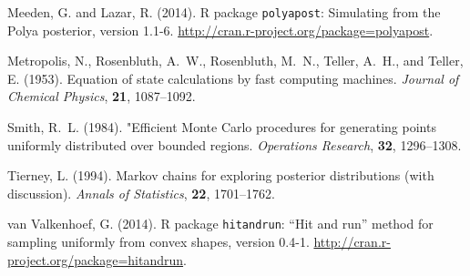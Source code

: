 \documentclass[11pt]{article}
\begin{document}
\begin{thebibliography}{}
Meeden, G. and Lazar, R. (2014).
\newblock R package \texttt{polyapost}: Simulating from the Polya posterior,
    version 1.1-6.
\newblock \url{http://cran.r-project.org/package=polyapost}.

Metropolis, N., Rosenbluth, A.~W., Rosenbluth, M.~N., Teller, A.~H., and
    Teller, E. (1953).
\newblock Equation of state calculations by fast computing machines.
\newblock \emph{Journal of Chemical Physics}, \textbf{21}, 1087--1092.

Smith, R.~L. (1984).
\newblock "Efficient Monte Carlo procedures for generating points
    uniformly distributed over bounded regions.
\newblock \emph{Operations Research}, \textbf{32}, 1296--1308.

Tierney, L. (1994).
\newblock Markov chains for exploring posterior distributions (with discussion).
\newblock \emph{Annals of Statistics}, \textbf{22}, 1701--1762.

van Valkenhoef, G. (2014).
\newblock R package \texttt{hitandrun}: ``Hit and run'' method for sampling
    uniformly from convex shapes, version 0.4-1.
\newblock \url{http://cran.r-project.org/package=hitandrun}.

\end{thebibliography}
\end{document}
